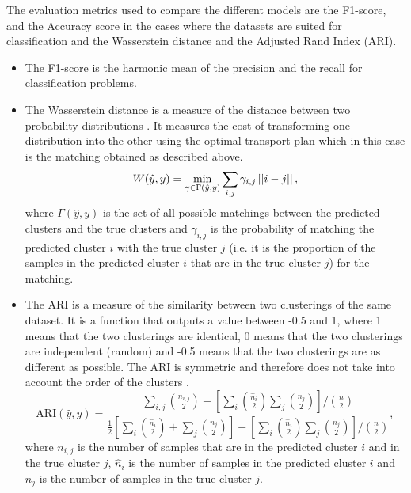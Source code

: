 The evaluation metrics used to compare the different models are the F1-score, and the Accuracy score in the cases where the datasets are suited for classification and the Wasserstein distance and the Adjusted Rand Index (ARI).
\begin{itemize}
    \item The F1-score is the harmonic mean of the precision and the recall for classification problems.
    \item The Wasserstein distance is a measure of the distance between two probability distributions \citep{ramdas2017wasserstein}. 
        It measures the cost of transforming one distribution into the other using the optimal transport plan which in this case is the matching obtained as described above.
        \begin{equation}
            W(\hat{y}, y) = \min_{\gamma \in \Gamma(\hat{y}, y)} \sum_{i, j} \gamma_{i, j} \left|\left|i - j\right|\right|
        ,\end{equation}
    where $\Gamma(\hat{y}, y)$ is the set of all possible matchings between the predicted clusters and the true clusters and $\gamma_{i, j}$ is the probability of matching the predicted cluster $i$ with the true cluster $j$ (i.e. it is the proportion of the samples in the predicted cluster $i$ that are in the true cluster $j$) for the matching.
\item The ARI is a measure of the similarity between two clusterings of the same dataset. It is a function that outputs a value between -0.5 and 1, where 1 means that the two clusterings are identical, 0 means that the two clusterings are independent (random) and -0.5 means that the two clusterings are as different as possible. The ARI is symmetric and therefore does not take into account the order of the clusters \citep{steinley2004properties}. 
    \begin{equation}
    \text{ARI}(\hat{y}, y) = \frac{\sum_{i, j} \binom{n_{i, j}}{2} - \left[\sum_i \binom{\hat{n}_i}{2} \sum_j \binom{n_j}{2}\right] / \binom{n}{2}}{\frac{1}{2} \left[\sum_i \binom{\hat{n}_i}{2} + \sum_j \binom{n_j}{2}\right] - \left[\sum_i \binom{\hat{n}_i}{2} \sum_j \binom{n_j}{2}\right] / \binom{n}{2}}
    ,\end{equation}
where $n_{i, j}$ is the number of samples that are in the predicted cluster $i$ and in the true cluster $j$, $\hat{n}_i$ is the number of samples in the predicted cluster $i$ and $n_j$ is the number of samples in the true cluster $j$.
\end{itemize}

